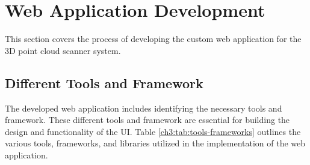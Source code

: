 


\section{Web Application Development}
This section covers the process of developing the custom web application for the 3D point cloud scanner system.



\subsection{Different Tools and Framework}
The developed web application includes identifying the necessary tools and framework. These different tools and framework are essential for building the design and functionality of the UI. Table \ref{ch3:tab:tools-frameworks} outlines the various tools, frameworks, and libraries utilized in the implementation of the web application.


